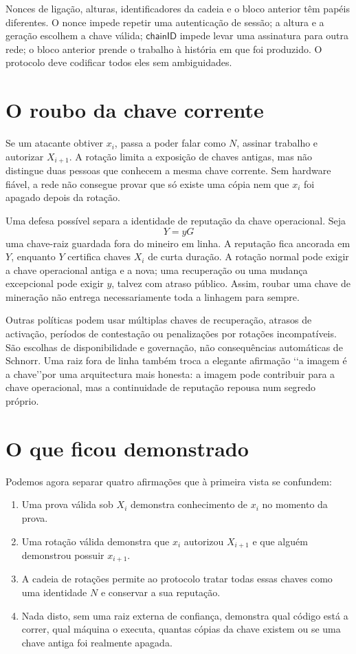 Nonces de ligação, alturas, identificadores da cadeia e o bloco anterior têm
papéis diferentes. O nonce impede repetir uma autenticação de sessão; a altura
e a geração escolhem a chave válida; \(\mathsf{chainID}\) impede levar uma
assinatura para outra rede; o bloco anterior prende o trabalho à história em
que foi produzido. O protocolo deve codificar todos eles sem ambiguidades.

\section{O roubo da chave corrente}

Se um atacante obtiver \(x_i\), passa a poder falar como \(N\), assinar trabalho
e autorizar \(X_{i+1}\). A rotação limita a exposição de chaves antigas, mas
não distingue duas pessoas que conhecem a mesma chave corrente. Sem hardware
fiável, a rede não consegue provar que só existe uma cópia nem que \(x_i\) foi
apagado depois da rotação.

Uma defesa possível separa a identidade de reputação da chave operacional.
Seja
\[
    Y=yG
\]
uma chave-raiz guardada fora do mineiro em linha. A reputação fica ancorada em
\(Y\), enquanto \(Y\) certifica chaves \(X_i\) de curta duração. A rotação
normal pode exigir a chave operacional antiga e a nova; uma recuperação ou uma
mudança excepcional pode exigir \(y\), talvez com atraso público. Assim, roubar
uma chave de mineração não entrega necessariamente toda a linhagem para sempre.

Outras políticas podem usar múltiplas chaves de recuperação, atrasos de
activação, períodos de contestação ou penalizações por rotações incompatíveis.
São escolhas de disponibilidade e governação, não consequências automáticas de
Schnorr. Uma raiz fora de linha também troca a elegante afirmação
\lq\lq a imagem é a chave\rq\rq por uma arquitectura mais honesta: a imagem pode contribuir para a
chave operacional, mas a continuidade de reputação repousa num segredo próprio.

\section{O que ficou demonstrado}

Podemos agora separar quatro afirmações que à primeira vista se confundem:
\begin{enumerate}
    \item Uma prova válida sob \(X_i\) demonstra conhecimento de \(x_i\) no
          momento da prova.
    \item Uma rotação válida demonstra que \(x_i\) autorizou \(X_{i+1}\) e
          que alguém demonstrou possuir \(x_{i+1}\).
    \item A cadeia de rotações permite ao protocolo tratar todas essas chaves
          como uma identidade \(N\) e conservar a sua reputação.
    \item Nada disto, sem uma raiz externa de confiança, demonstra qual código
          está a correr, qual máquina o executa, quantas cópias da chave existem
          ou se uma chave antiga foi realmente apagada.
\end{enumerate}

